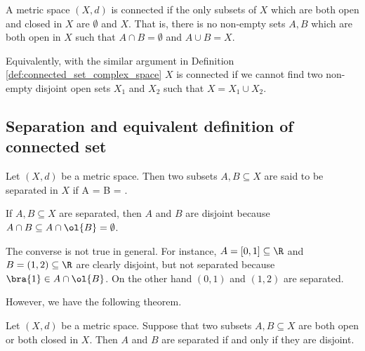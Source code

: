 \begin{definition}\label{def:connected_set_metric}
A metric space $(X,d)$ is connected if the only subsets of $X$ which are both open and closed in $X$ are $\emptyset$ and $X$. That is, there is no non-empty sets $A,B$ which are both open in $X$ such that $A\cap B = \emptyset$ and $A\cup B = X$.
\end{definition}

\begin{remark}
Equivalently, with the similar argument in Definition \ref{def:connected_set_complex_space} $X$ is connected if we cannot find two non-empty disjoint open sets $X_1$ and $X_2$ such that $X = X_1\cup X_2$.
\end{remark}



\subsection{Separation and equivalent definition of connected set}

\begin{definition}
Let $(X,d)$ be a metric space. Then two subsets $A,B\subseteq X$ are said to be separated in $X$ if
\be
A\cap {} =  \cap B = \emptyset.
\ee
\end{definition}

\begin{remark}
If $A,B\subseteq X$ are separated, then $A$ and $B$ are disjoint because $A\cap B \subseteq A \cap \ol{B} = \emptyset$.
\end{remark}

\begin{example}
The converse is not true in general. For instance, $A = [0,1]\subseteq \R$ and $B = (1,2)\subseteq \R$ are clearly disjoint, but not separated because $\bra{1}\in A\cap \ol{B}$. On the other hand $(0,1)$ and $(1,2)$ are separated.
\end{example}

However, we have the following theorem.

\begin{theorem}\label{thm:subsets_both_open_closed_are_separated_iff_disjoint_metric}
Let $(X,d)$ be a metric space. Suppose that two subsets $A,B\subseteq X$ are both open or both closed in $X$. Then $A$ and $B$ are separated if and only if they are disjoint.
\end{theorem}

